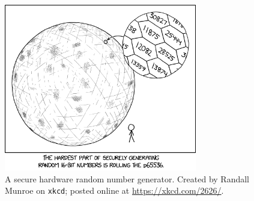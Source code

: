 \begin{figure}[t]
\centering
    \includegraphics[width=0.75\textwidth]{figures/xkcd/xkcd_2626_d65536.png}
    \caption[\texttt{xkcd} D65536]{A secure
        hardware random number generator.
        Created by Randall Munroe on \texttt{xkcd};
        posted online at \url{https://xkcd.com/2626/}.
        }
    \label{fig:xkcd_d65536}
\end{figure}
